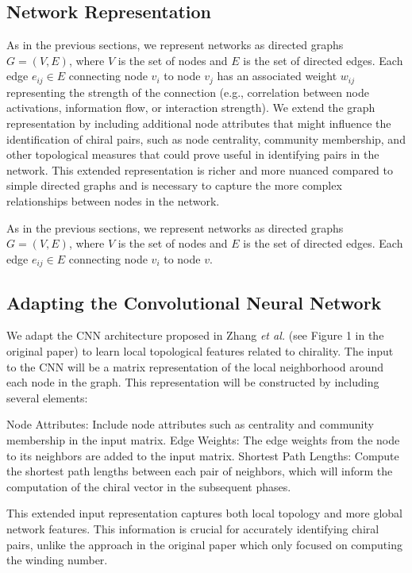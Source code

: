 \documentclass[12pt, a4paper]{article}
\begin{document}
\subsection{Network Representation}

As in the previous sections, we represent networks as directed graphs $G = (V, E)$, where $V$ is the set of nodes and $E$ is the set of directed edges. Each edge $e_{ij} \in E$ connecting node $v_i$ to node $v_{j}$ has an associated weight $w_{ij}$ representing the strength of the connection (e.g., correlation between node activations, information flow, or interaction strength). We extend the graph representation by including additional node attributes that might influence the identification of chiral pairs, such as node centrality, community membership, and other topological measures that could prove useful in identifying pairs in the network.  This extended representation is richer and more nuanced compared to simple directed graphs and is necessary to capture the more complex relationships between nodes in the network.

As in the previous sections, we represent networks as directed graphs $G = (V, E)$, where $V$ is the set of nodes and $E$ is the set of directed edges.  Each edge $e_{ij} \in E$ connecting node $v_{i}$ to node $v$.

\subsection{Adapting the Convolutional Neural Network}

We adapt the CNN architecture proposed in Zhang \textit{et al.} \cite{zhang2018machine}  (see Figure 1 in the original paper) to learn local topological features related to chirality. The input to the CNN will be a matrix representation of the local neighborhood around each node in the graph.  This representation will be constructed by including several elements:

Node Attributes:  Include node attributes such as centrality and community membership in the input matrix.
Edge Weights:  The edge weights from the node to its neighbors are added to the input matrix.
Shortest Path Lengths:  Compute the shortest path lengths between each pair of neighbors, which will inform the computation of the chiral vector in the subsequent phases.

This extended input representation captures both local topology and more global network features. This information is crucial for accurately identifying chiral pairs, unlike the approach in the original paper which only focused on computing the winding number.
\end{document}
